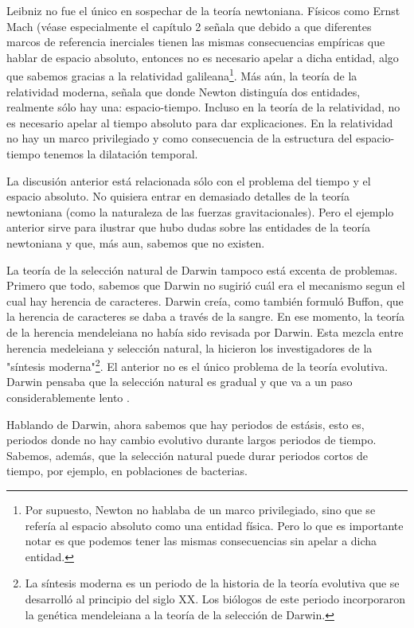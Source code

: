 Leibniz no fue el único en sospechar de la teoría newtoniana. Físicos como Ernst Mach (véase especialmente el capítulo 2 \parencite{mach2013} señala que debido a que diferentes marcos de referencia inerciales tienen las mismas consecuencias empíricas que hablar de espacio absoluto, entonces no es necesario apelar a dicha entidad, algo que sabemos gracias a la relatividad galileana\footnote{Por supuesto, Newton no hablaba de un marco privilegiado, sino que se refería al espacio absoluto como una entidad física. Pero lo que es importante notar es que podemos tener las mismas consecuencias sin apelar a dicha entidad.}.
Más aún, la teoría de la relatividad moderna, señala que donde Newton distinguía dos entidades, realmente sólo hay una: espacio-tiempo.
Incluso en la teoría de la relatividad, no es necesario apelar al tiempo absoluto para dar explicaciones. 
En la relatividad no hay un marco privilegiado y como consecuencia de la estructura del espacio-tiempo tenemos la dilatación temporal.

La discusión anterior está relacionada sólo con el problema del tiempo y el espacio absoluto.
No quisiera entrar en demasiado detalles de la teoría newtoniana (como la naturaleza de las fuerzas gravitacionales).
Pero el ejemplo anterior sirve para ilustrar que hubo dudas sobre las entidades de la teoría newtoniana y que, más aun, sabemos que no existen.

La teoría de la selección natural de Darwin tampoco está excenta de problemas.
Primero que todo, sabemos que Darwin no sugirió cuál era el mecanismo segun el cual hay herencia de caracteres.
Darwin creía, como también formuló Buffon, que la herencia de caracteres se daba a través de la sangre. 
En ese momento, la teoría de la herencia mendeleiana no había sido revisada por Darwin. 
Esta mezcla entre herencia medeleiana y selección natural, la hicieron los investigadores de la "síntesis moderna"\footnote{La síntesis moderna es un periodo de la historia de la teoría evolutiva que se desarrolló al principio del siglo XX. Los biólogos de este periodo incorporaron la genética mendeleiana a la teoría de la selección de Darwin.}. \parencite[][p. 50]{dieguez2012}
El anterior no es el único problema de la teoría evolutiva.
Darwin pensaba que la selección natural es gradual y que va a un paso considerablemente lento \parencite{losos2014}.

Hablando de Darwin, ahora sabemos que hay periodos de estásis, esto es, periodos donde no hay cambio evolutivo durante largos periodos de tiempo.
Sabemos, además, que la selección natural puede durar periodos cortos de tiempo, por ejemplo, en poblaciones de bacterias.

